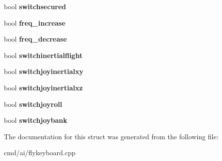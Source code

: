 \begin{DoxyCompactItemize}
\item 
bool {\bfseries switchsecured}\hypertarget{structStarShipControlKeyboard_ad2d8ab16cf8ad19872d1e5756a60dfc1}{}\label{structStarShipControlKeyboard_ad2d8ab16cf8ad19872d1e5756a60dfc1}

\item 
bool {\bfseries freq\+\_\+increase}\hypertarget{structStarShipControlKeyboard_ace9c0f1b81458c82155bb36b080201a1}{}\label{structStarShipControlKeyboard_ace9c0f1b81458c82155bb36b080201a1}

\item 
bool {\bfseries freq\+\_\+decrease}\hypertarget{structStarShipControlKeyboard_afeae130b9454e2b97976a3dd754f8e34}{}\label{structStarShipControlKeyboard_afeae130b9454e2b97976a3dd754f8e34}

\item 
bool {\bfseries switchinertialflight}\hypertarget{structStarShipControlKeyboard_ab3e61b9de16686322e56f44dee5a136e}{}\label{structStarShipControlKeyboard_ab3e61b9de16686322e56f44dee5a136e}

\item 
bool {\bfseries switchjoyinertialxy}\hypertarget{structStarShipControlKeyboard_a5859e6820987c13c4ab5092ef3f13de2}{}\label{structStarShipControlKeyboard_a5859e6820987c13c4ab5092ef3f13de2}

\item 
bool {\bfseries switchjoyinertialxz}\hypertarget{structStarShipControlKeyboard_ac379273ee2fa9eb947a7383c73d3003c}{}\label{structStarShipControlKeyboard_ac379273ee2fa9eb947a7383c73d3003c}

\item 
bool {\bfseries switchjoyroll}\hypertarget{structStarShipControlKeyboard_aa8d0a8bbfd1540d11ebbda18ab5f3913}{}\label{structStarShipControlKeyboard_aa8d0a8bbfd1540d11ebbda18ab5f3913}

\item 
bool {\bfseries switchjoybank}\hypertarget{structStarShipControlKeyboard_a3897ba4d1049f71031c95863996d8a1c}{}\label{structStarShipControlKeyboard_a3897ba4d1049f71031c95863996d8a1c}

\end{DoxyCompactItemize}


The documentation for this struct was generated from the following file\+:\begin{DoxyCompactItemize}
\item 
cmd/ai/flykeyboard.\+cpp\end{DoxyCompactItemize}
